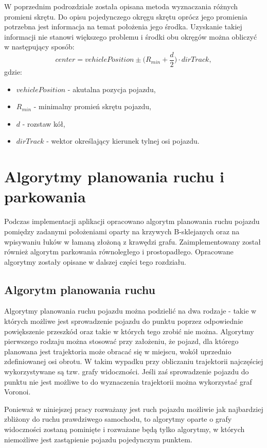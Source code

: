 \documentclass[a4paper,11pt,twoside]{report}
\theoremstyle{definition}
\begin{document}
W poprzednim podrozdziale została opisana metoda wyznaczania różnych promieni skrętu. Do opisu pojedynczego okręgu skrętu oprócz jego promienia potrzebna jest informacja na temat położenia jego środka. Uzyskanie takiej informacji nie stanowi większego problemu i środki obu okręgów można obliczyć w następujący sposób:
$$
center = vehiclePosition \pm \Big(R_{min} + \frac{d}{2}\Big) \cdot dirTrack,
$$
gdzie: 
\begin{itemize}
	\item $vehiclePosition$ - akutalna pozycja pojazdu,
	\item $R_{min}$ - minimalny promień skrętu pojazdu,
	\item $d$ - rozstaw kół,
	\item $dirTrack$ - wektor określający kierunek tylnej osi pojazdu.
\end{itemize}

\chapter{Algorytmy planowania ruchu i parkowania}

Podczas implementacji aplikacji opracowano algorytm planowania ruchu pojazdu pomiędzy zadanymi położeniami oparty na krzywych B-sklejanych oraz na wpisywaniu łuków w łamaną złożoną z krawędzi grafu. Zaimplementowany został również algorytm parkowania równoległego i prostopadłego. Opracowane algorytmy zostały opisane w dalszej części tego rozdziału.

\section{Algorytm planowania ruchu}

Algorytmy planowania ruchu pojazdu można podzielić na dwa rodzaje - takie w których możliwe jest sprowadzenie pojazdu do punktu poprzez odpowiednie powiększenie przeszkód oraz takie w których tego zrobić nie można. Algorytmy pierwszego rodzaju można stosować przy założeniu, że pojazd, dla którego planowana jest trajektoria może obracać się w miejscu, wokół uprzednio zdefiniowanej osi obrotu. W takim wypadku przy obliczaniu trajektorii najczęściej wykorzystywane są tzw. grafy widoczności. Jeśli zaś sprowadzenie pojazdu do punktu nie jest możliwe to do wyznaczenia trajektorii można wykorzystać graf Voronoi.

Ponieważ w niniejszej pracy rozważany jest ruch pojazdu możliwie jak najbardziej zbliżony do ruchu prawdziwego samochodu, to algorytmy oparte o grafy widoczności zostaną pominięte i rozważane będą tylko algorytmy, w których niemożliwe jest zastąpienie pojazdu pojedynczym punktem.
\end{document}
